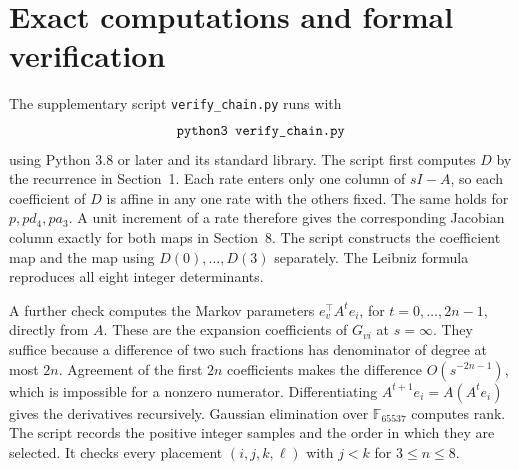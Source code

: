 \documentclass[11pt,a4paper]{article}
\newcommand{\sect}[1]{\section{#1}}
\begin{document}
\sect{Exact computations and formal verification}
The supplementary script \texttt{verify\_chain.py} runs with
\[
                    \text{\ttfamily python3 verify\_chain.py}
\]
using Python 3.8 or later and its standard library. The script first computes \(D\) by the recurrence in Section~1. Each rate enters only one column of \(sI-A\), so each coefficient of \(D\) is affine in any one rate with the others fixed. The same holds for \(p,pd_4,pa_3\). A unit increment of a rate therefore gives the corresponding Jacobian column exactly for both maps in Section~8. The script constructs the coefficient map and the map using \(D(0),\ldots,D(3)\) separately. The Leibniz formula reproduces all eight integer determinants.

A further check computes the Markov parameters \(e_v^\top A^t e_i\), for \(t=0,\ldots,2n-1\), directly from \(A\). These are the expansion coefficients of \(G_{vi}\) at \(s=\infty\). They suffice because a difference of two such fractions has denominator of degree at most \(2n\). Agreement of the first \(2n\) coefficients makes the difference \(O(s^{-2n-1})\), which is impossible for a nonzero numerator. Differentiating \(A^{t+1}e_i=A(A^te_i)\) gives the derivatives recursively. Gaussian elimination over \(\mathbb F_{65537}\) computes rank. The script records the positive integer samples and the order in which they are selected. It checks every placement \((i,j,k,\ell)\) with \(j<k\) for \(3\le n\le8\).
\end{document}
